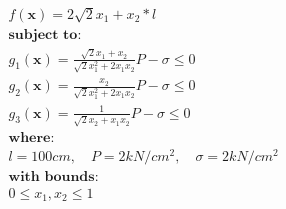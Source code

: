 \begin{equation*}
\begin{aligned}
& f(\bm{x}) = 2 \sqrt{2} x_1 + x_2 * l \\[0.5em]
& \textbf{subject to:}\\
& g_1(\bm{x}) = \frac{\sqrt{2} x_1 + x_2}{\sqrt{2} x_1^2 + 2 x_1 x_2} P - \sigma \leq 0 \\
& g_2(\bm{x}) = \frac{x_2}{\sqrt{2} x_1^2 + 2 x_1 x_2} P - \sigma \leq 0 \\
& g_3(\bm{x}) = \frac{1}{\sqrt{2} x_2 + x_1 x_2} P - \sigma \leq 0 \\[0.5em]
& \textbf{where:} \\
& l = 100cm, \quad P = 2 kN/cm^2, \quad \sigma = 2 kN/cm^2 \\[0.5em]
& \textbf{with bounds:} \\
& 0 \leq x_1, x_2 \leq 1
\end{aligned}
\end{equation*}